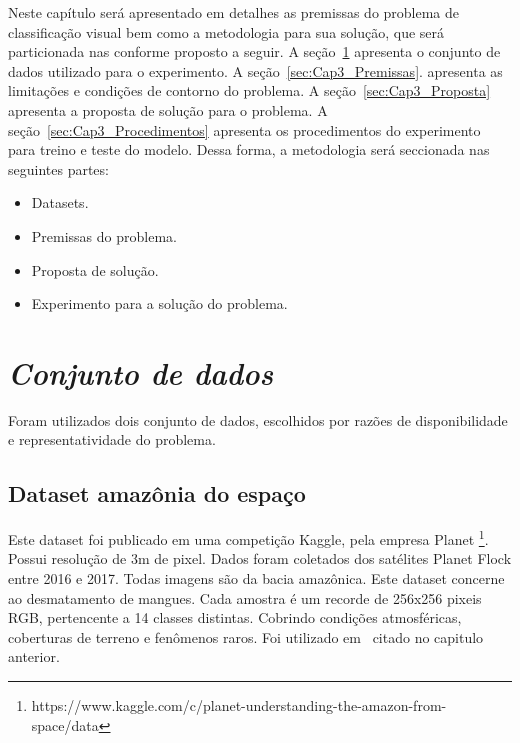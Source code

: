 Neste capítulo será apresentado em detalhes as premissas do problema de classificação visual bem como a metodologia para sua solução, que será particionada nas conforme proposto a seguir. A seção~\ref{sec:Cap3_Dataset} apresenta o conjunto de dados utilizado para o experimento.  A seção~\ref{sec:Cap3_Premissas}. apresenta as limitações e condições de contorno do problema. A seção~\ref{sec:Cap3_Proposta} apresenta a proposta de solução para o problema. A seção~\ref{sec:Cap3_Procedimentos} apresenta os procedimentos do experimento para treino e teste do modelo. Dessa forma, a metodologia será seccionada nas seguintes partes:

\begin{itemize}
    \item  Datasets.
    \item  Premissas do problema.
    \item  Proposta de solução.
    \item  Experimento para a solução do problema.

\end{itemize}


\section{\textit{Conjunto de dados}}\label{sec:Cap3_Dataset}
Foram utilizados dois conjunto de dados, escolhidos por razões de disponibilidade e representatividade do problema. 


\subsection{Dataset amazônia do espaço}\label{sec:Cap3_Amazon_dataset}

Este dataset foi publicado em uma competição Kaggle, pela empresa Planet \footnote{https://www.kaggle.com/c/planet-understanding-the-amazon-from-space/data}. Possui resolução de 3m de pixel. Dados foram coletados dos satélites Planet Flock entre 2016 e 2017. Todas imagens são da bacia amazônica. Este dataset concerne ao desmatamento de mangues. Cada amostra é um recorde de 256x256 pixeis RGB, pertencente a 14 classes distintas. Cobrindo condições atmosféricas, coberturas de terreno e fenômenos raros. Foi utilizado em~\cite{9701667} citado no capitulo anterior.

